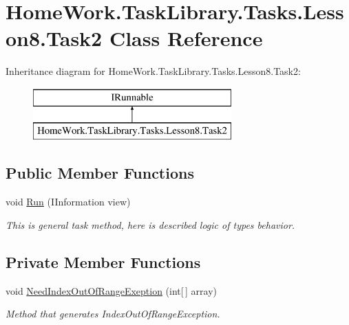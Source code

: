 \hypertarget{class_home_work_1_1_task_library_1_1_tasks_1_1_lesson8_1_1_task2}{}\section{Home\+Work.\+Task\+Library.\+Tasks.\+Lesson8.\+Task2 Class Reference}
\label{class_home_work_1_1_task_library_1_1_tasks_1_1_lesson8_1_1_task2}
Inheritance diagram for Home\+Work.\+Task\+Library.\+Tasks.\+Lesson8.\+Task2\+:\begin{figure}[H]
\begin{center}
\leavevmode
\includegraphics[height=2.000000cm]{class_home_work_1_1_task_library_1_1_tasks_1_1_lesson8_1_1_task2}
\end{center}
\end{figure}
\subsection*{Public Member Functions}
\begin{DoxyCompactItemize}
\item 
void \mbox{\hyperlink{class_home_work_1_1_task_library_1_1_tasks_1_1_lesson8_1_1_task2_a5e5b2b989f3de82dea23c9c60cf8cbdb}{Run}} (I\+Information view)
\begin{DoxyCompactList}\small\item\em This is general task method, here is described logic of types behavior. \end{DoxyCompactList}\end{DoxyCompactItemize}
\subsection*{Private Member Functions}
\begin{DoxyCompactItemize}
\item 
void \mbox{\hyperlink{class_home_work_1_1_task_library_1_1_tasks_1_1_lesson8_1_1_task2_a6f580cba405e444ba2669f133c32e472}{Need\+Index\+Out\+Of\+Range\+Exeption}} (int\mbox{[}$\,$\mbox{]} array)
\begin{DoxyCompactList}\small\item\em Method that generates Index\+Out\+Of\+Range\+Exception. \end{DoxyCompactList}\end{DoxyCompactItemize}


